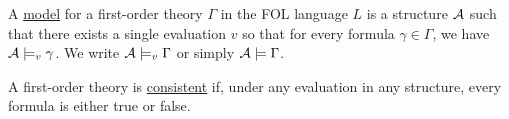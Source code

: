 \begin{definition}\label{def:first_order_model}\cite[definition 4.4]{Nerode2012}
  A \uline{model} for a first-order theory $\Gamma$ in the FOL language $L$ is a structure $\mathcal A$ such that there exists a single evaluation $v$ so that for every formula $\gamma \in \Gamma$, we have $\mathcal A \models_v \gamma$. We write $\mathcal A \models_v \Gamma$ or simply $\mathcal A \models \Gamma$.
\end{definition}

\begin{definition}\label{def:first_order_consistent}
  A first-order theory is \uline{consistent} if, under any evaluation in any structure, every formula is either true or false.
\end{definition}
